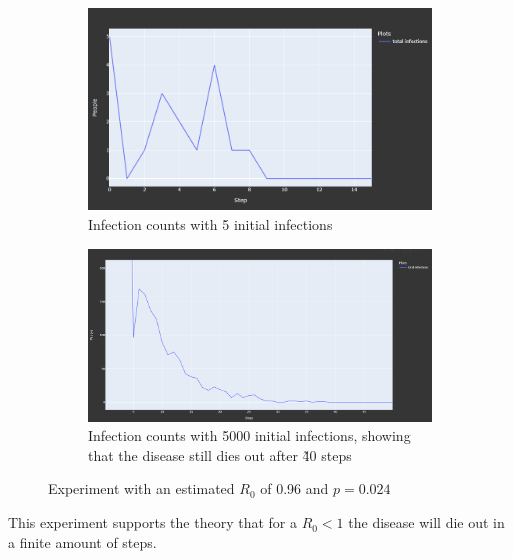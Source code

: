 \begin{figure}
    \centering
    \begin{subfigure}[b]{0.475\textwidth}
        \centering
        \includegraphics[width=\textwidth]{images/exp_r0_small_1.png}
        \caption[Network2]%
        {{\small Infection counts with 5 initial infections}}   
    \end{subfigure}
    \hfill
    \begin{subfigure}[b]{0.475\textwidth}  
        \centering 
        \includegraphics[width=\textwidth]{images/exp_r0_success.png}
        \caption[]%
        {{\small Infection counts with 5000 initial infections, showing that the disease
        still dies out after \~40 steps}}    
    \end{subfigure}
    \caption[ Experiment with an estimated $R_0$ of 0.96 and $p = 0.024$ ]
    {\small Experiment with an estimated $R_0$ of 0.96 and $p = 0.024$} 
    \label{fig:exp_r0_small}
\end{figure}



This experiment supports the theory that for a $R_0 < 1$ the disease will die out
in a finite amount of steps. 

